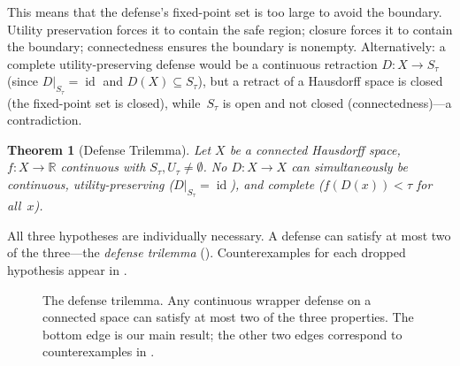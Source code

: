 \documentclass[11pt]{article}
\newtheorem{theorem}{Theorem}[section]
\newcommand{\R}{\mathbb{R}}
\newcommand{\id}{\operatorname{id}}
\begin{document}
This means that the defense's fixed-point set is too large to avoid the
boundary. Utility preservation forces it to contain the safe region;
closure forces it to contain the boundary; connectedness ensures the
boundary is nonempty. Alternatively: a complete utility-preserving
defense would be a continuous retraction $D\colon X \to S_\tau$
(since $D|_{S_\tau} = \id$ and $D(X) \subseteq S_\tau$), but a
retract of a Hausdorff space is closed (the fixed-point set is
closed), while~$S_\tau$ is open and not closed
(connectedness)---a contradiction.

\begin{theorem}[Defense Trilemma]
\label{thm:trilemma}
Let $X$ be a connected Hausdorff space, $f\colon X \to \R$ continuous
with $S_\tau, U_\tau \neq \emptyset$. No $D\colon X \to X$ can
simultaneously be continuous, utility-preserving ($D|_{S_\tau} = \id$),
and complete ($f(D(x)) < \tau$ for all~$x$).
\end{theorem}

All three hypotheses are individually necessary. A defense can satisfy
at most two of the three---the \emph{defense trilemma}
(). Counterexamples for each dropped hypothesis
appear in .

\begin{figure}[t]
\centering
{}
\caption{The defense trilemma. Any continuous wrapper defense on a
connected space can satisfy at most two of
the three properties. The bottom edge is our main result; the other
two edges correspond to counterexamples in .}
\label{fig:trilemma}
\end{figure}
\end{document}
